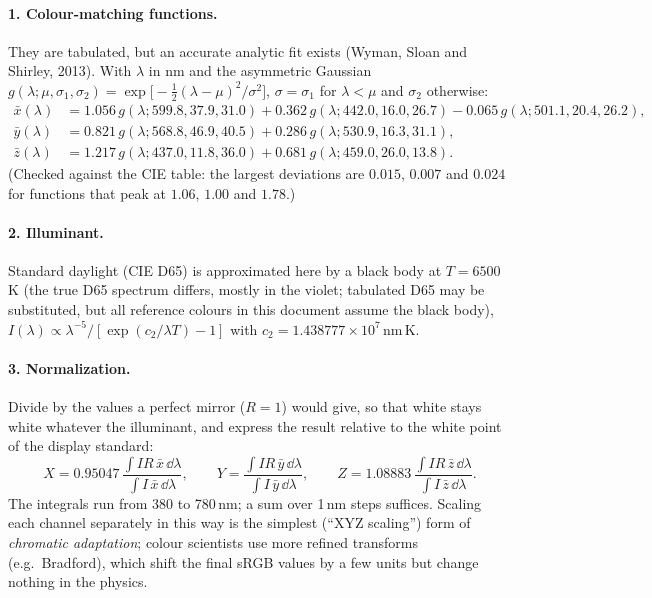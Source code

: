 \paragraph{1. Colour-matching functions.} They are tabulated, but an
accurate analytic fit exists (Wyman, Sloan and Shirley, 2013). With
$\lambda$ in nm and the asymmetric Gaussian
$g(\lambda;\mu,\sigma_1,\sigma_2) =
\exp\!\big[-\tfrac12(\lambda-\mu)^2/\sigma^2\big]$, $\sigma = \sigma_1$
for $\lambda<\mu$ and $\sigma_2$ otherwise:
\begin{equation}
\begin{aligned}
\bar x(\lambda) &= 1.056\,g(\lambda;599.8,37.9,31.0)
+ 0.362\,g(\lambda;442.0,16.0,26.7) - 0.065\,g(\lambda;501.1,20.4,26.2),\\
\bar y(\lambda) &= 0.821\,g(\lambda;568.8,46.9,40.5)
+ 0.286\,g(\lambda;530.9,16.3,31.1),\\
\bar z(\lambda) &= 1.217\,g(\lambda;437.0,11.8,36.0)
+ 0.681\,g(\lambda;459.0,26.0,13.8).
\end{aligned}
\label{eq:cmf}
\end{equation}
(Checked against the CIE table: the largest deviations are $0.015$,
$0.007$ and $0.024$ for functions that peak at $1.06$, $1.00$ and
$1.78$.)

\paragraph{2. Illuminant.} Standard daylight (CIE D65) is approximated here
by a black body at $T = 6500$\,K (the true D65 spectrum differs, mostly
in the violet; tabulated D65 may be substituted, but all
reference colours in this document assume the black body), $I(\lambda)\propto\lambda^{-5}/
[\exp(c_2/\lambda T)-1]$ with $c_2 = 1.438777\times10^{7}$\,nm\,K.

\paragraph{3. Normalization.} Divide by the values a perfect mirror
($R = 1$) would give, so that white stays white whatever the illuminant,
and express the result relative to the white point of the display
standard:
\begin{equation}
X = 0.95047\,\frac{\int I R\,\bar x\,\dd\lambda}{\int I\,\bar x\,\dd\lambda},
\qquad
Y = \frac{\int I R\,\bar y\,\dd\lambda}{\int I\,\bar y\,\dd\lambda},
\qquad
Z = 1.08883\,\frac{\int I R\,\bar z\,\dd\lambda}{\int I\,\bar z\,\dd\lambda}.
\label{eq:xyz}
\end{equation}
The integrals run from 380 to 780\,nm; a sum over 1\,nm steps suffices.
Scaling each channel separately in this way is the simplest (``XYZ
scaling'') form of \emph{chromatic adaptation}; colour scientists use
more refined transforms (e.g.\ Bradford), which shift the final sRGB
values by a few units but change nothing in the physics.

